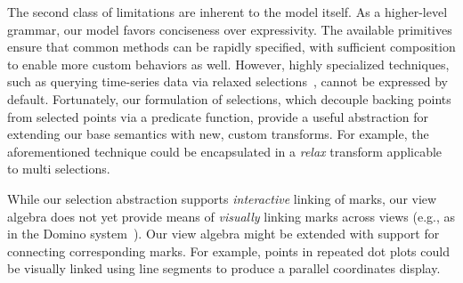 The second class of limitations are inherent to the model itself. As a
higher-level grammar, our model favors conciseness over expressivity. The
available primitives ensure that common methods can be rapidly specified, with
sufficient composition to enable more custom behaviors as well. However, highly
specialized techniques, such as querying time-series data via relaxed
selections~\cite{holz:relaxed}, cannot be expressed by default. Fortunately, our
formulation of selections, which decouple backing points from selected points
via a predicate function, provide a useful abstraction for extending our base
semantics with new, custom transforms. For example, the aforementioned technique
could be encapsulated in a \emph{relax} transform applicable to multi
selections.

While our selection abstraction supports \emph{interactive} linking of marks,
our view algebra does not yet provide means of \emph{visually} linking marks
across views (e.g., as in the Domino system~\cite{gratzl:domino}). Our view
algebra might be extended with support for connecting corresponding marks. For
example, points in repeated dot plots could be visually linked using line
segments to produce a parallel coordinates display.